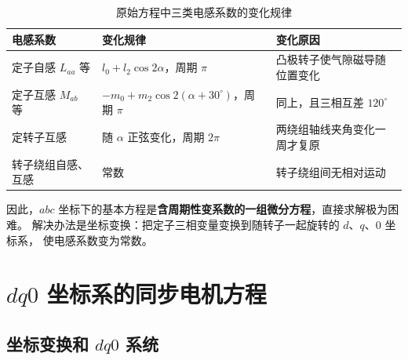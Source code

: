 \begin{table}[htbp]
  \centering
  \caption{原始方程中三类电感系数的变化规律}
  \small
  \begin{tabular}{@{}lll@{}}
    \toprule
    电感系数 & 变化规律 & 变化原因 \\
    \midrule
    定子自感 $L_{aa}$ 等 & $l_0+l_2\cos2\alpha$，周期 $\pi$ & 凸极转子使气隙磁导随位置变化 \\
    定子互感 $M_{ab}$ 等 & $-m_0+m_2\cos2(\alpha+30^\circ)$，周期 $\pi$ & 同上，且三相互差 $120^\circ$ \\
    定转子互感 & 随 $\alpha$ 正弦变化，周期 $2\pi$ & 两绕组轴线夹角变化一周才复原 \\
    转子绕组自感、互感 & 常数 & 转子绕组间无相对运动 \\
    \bottomrule
  \end{tabular}
\end{table}

因此，$abc$ 坐标下的基本方程是\textbf{含周期性变系数的一组微分方程}，直接求解极为困难。
解决办法是坐标变换：把定子三相变量变换到随转子一起旋转的 $d$、$q$、$0$ 坐标系，
使电感系数变为常数。


\section{$dq0$ 坐标系的同步电机方程}

\subsection{坐标变换和 $dq0$ 系统}

